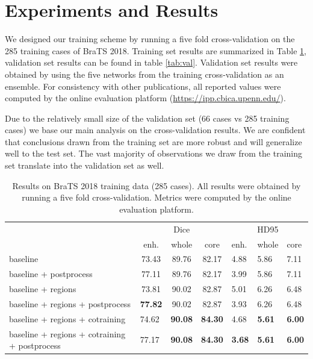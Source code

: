 \documentclass{templates/llncs} %
\begin{document}
\section{Experiments and Results}
  We designed our training scheme by running a five fold cross-validation on the 285 training cases of BraTS 2018. Training set results are summarized in Table \ref{tab:results}, validation set results can be found in table \ref{tab:val}. Validation set results were obtained by using the five networks from the training cross-validation as an ensemble. For consistency with other publications, all reported values were computed by the online evaluation platform (\href{}{https://ipp.cbica.upenn.edu/}).
  
  Due to the relatively small size of the validation set (66 cases vs 285 training cases) we base our main analysis on the cross-validation results. We are confident that conclusions drawn from the training set are more robust and will generalize well to the test set. The vast majority of observations we draw from the training set translate into the validation set as well.
  
  
\begin{table}[]
\label{tab:results}
\caption{Results on BraTS 2018 training data (285 cases). All results were obtained by running a five fold cross-validation. Metrics were computed by the online evaluation platform.}
\begin{tabular}{lccclll}
    & \multicolumn{3}{c}{Dice}     & \multicolumn{3}{c}{HD95}  \\
\multicolumn{1}{c}{}    & enh.  & whole & core  & enh. & whole   & core \\
\hline
baseline     & 73.43 & 89.76 & 82.17 & 4.88 & 5.86 & 7.11 \\
baseline + postprocess  & 77.11 & 89.76 & 82.17 & 3.99 & 5.86 & 7.11 \\
baseline + regions    & 73.81 & 90.02 & 82.87 & 5.01 & 6.26 & 6.48 \\
baseline + regions + postprocess   & \textbf{77.82} & 90.02 & 82.87 & 3.93 & 6.26 & 6.48 \\
baseline + regions + cotraining  & \multicolumn{1}{l}{74.62} & \multicolumn{1}{l}{\textbf{90.08}} & \multicolumn{1}{l}{\textbf{84.30}} & 4.68 & \textbf{5.61} & \textbf{6.00} \\
baseline + regions + cotraining + postprocess & \multicolumn{1}{l}{77.17} & \multicolumn{1}{l}{\textbf{90.08}} & \multicolumn{1}{l}{\textbf{84.30}} & \textbf{3.68} & \textbf{5.61} & \textbf{6.00}
\end{tabular}
\end{table}
\end{document}
